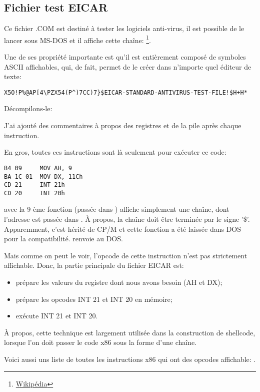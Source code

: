 
\subsection{ Fichier test EICAR}
\label{subsec:EICAR}

Ce fichier .COM est destiné à tester les logiciels anti-virus, il est possible de
le lancer sous MS-DOS et il affiche cette chaîne: 
\footnote{\href{http://go.yurichev.com/17006}{Wikipédia}}.

Une de ses propriété importante est qu'il est entièrement composé de symboles ASCII
affichables, qui, de fait, permet de le créer dans n'importe quel éditeur de texte:

\begin{lstlisting}
X5O!P%@AP[4\PZX54(P^)7CC)7}$EICAR-STANDARD-ANTIVIRUS-TEST-FILE!$H+H*
\end{lstlisting}

Décompilons-le:



J'ai ajouté des commentaires à propos des registres et de la pile après chaque instruction.

En gros, toutes ces instructions sont là seulement pour exécuter ce code:

\begin{lstlisting}[style=customasmx86]
B4 09     MOV AH, 9
BA 1C 01  MOV DX, 11Ch
CD 21     INT 21h
CD 20     INT 20h
\end{lstlisting}

 avec la 9-ème fonction (passée dans ) affiche simplement une chaîne,
dont l'adresse est passée dans .
À propos, la chaîne doit être terminée par le signe '\$'.
Apparemment, c'est hérité de \gls{CP/M} et cette fonction a été laissée dans DOS
pour la compatibilité.
 renvoie au DOS.

Mais comme on peut le voir, l'opcode de cette instruction n'est pas strictement
affichable.
Donc, la partie principale du fichier EICAR est:

\begin{itemize}
\item prépare les valeurs du registre dont nous avons besoin (AH et DX);
\item prépare les opcodes INT 21 et INT 20 en mémoire;
\item exécute INT 21 et INT 20.
\end{itemize}


À propos, cette technique est largement utilisée dans la construction de shellcode,
lorsque l'on doit passer le code x86 sous la forme d'une chaîne.

Voici aussi uns liste de toutes les instructions x86 qui ont des opcodes affichable:
.
